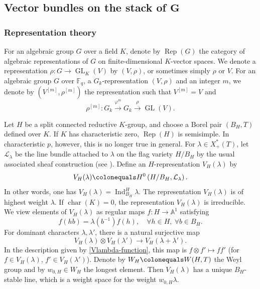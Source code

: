 \documentclass[11pt]{amsart}
\numberwithin{equation}{section}
\theoremstyle{definition}
\theoremstyle{remark}
\newcommand{\Lcal}{{\mathcal L}}
\renewcommand{\AA}{\mathbb{A}}
\newcommand{\FF}{\mathbb{F}}
\DeclareMathOperator{\Rep}{Rep}
\DeclareMathOperator{\GL}{GL}
\DeclareMathOperator{\Ind}{Ind}
\DeclareMathOperator{\cara}{char}
\newcommand{\lra}{\longrightarrow}
\begin{document}
\subsection{Vector bundles on the stack of $\boldsymbol{G}$} \label{sec-vector-bundles-gzipz}

\subsubsection{Representation theory}\label{subsec-remind}

For an algebraic group $G$ over a field $K$, denote by $\Rep(G)$ the category of algebraic representations of $G$ on finite-dimensional $K$-vector spaces. We denote a representation $\rho\colon G\to \GL_K(V)$ by $(V,\rho)$, or sometimes simply $\rho$ or $V$. For an algebraic group $G$ over $\FF_q$, a $G_k$-representation $(V,\rho)$ and an integer $m$, we denote by $(V^{[m]},\rho^{[m]})$ the representation such that $V^{[m]}=V$ and
\begin{equation}\label{equ-rhom}
  \rho^{[m]} \colon  G_k \xrightarrow{\varphi^m} G_k \overset{\rho}\lra \GL(V).
\end{equation}

Let $H$ be a split connected reductive $K$-group, and choose a Borel pair $(B_H,T)$ defined over $K$. If $K$ has characteristic zero, $\Rep(H)$ is semisimple. In characteristic $p$, however, this is no longer true in general. For $\lambda\in X_{+}^*(T)$, let $\Lcal_\lambda$ be the line bundle attached to $\lambda$ on the flag variety $H/B_H$ by the usual associated sheaf construction (see \cite[Section~5.8]{jantzen-representations}). Define an $H$-representation $V_H(\lambda)$ by
\begin{equation}\label{VlambdadefH}
    V_H(\lambda) \colonequals H^0\left(H/B_H,\Lcal_\lambda\right) . 
\end{equation}
In other words, one has $V_H(\lambda)=\Ind_{B_H}^{H} \lambda$. The representation $V_H(\lambda)$ is of highest weight $\lambda$. If $\cara(K)=0$, the representation $V_H(\lambda)$ is irreducible. We view elements of $V_H(\lambda)$ as regular maps $f \colon H\to \AA^1$ satisfying
\begin{equation}\label{Vlambda-function}
f(hb)=\lambda\left(b^{-1}\right)f(h), \quad \forall h\in H, \ \forall b\in B_H.    
\end{equation}
For dominant characters $\lambda,\lambda'$, there is a natural surjective map
\begin{equation}\label{Vlambda-natural-map}
V_H(\lambda)\otimes V_H(\lambda')\lra V_H(\lambda+\lambda').
\end{equation}
In the description given by \eqref{Vlambda-function}, this map is $f\otimes f'\mapsto ff'$ (for $f\in V_H(\lambda)$, $f'\in V_H(\lambda')$). Denote by $W_H \colonequals W(H,T)$ the Weyl group and by $w_{0,H}\in W_H$ the longest element. Then $V_H(\lambda)$ has a unique $B_H$-stable line, which is a weight space for the weight $w_{0,H}\lambda$. 
\end{document}

